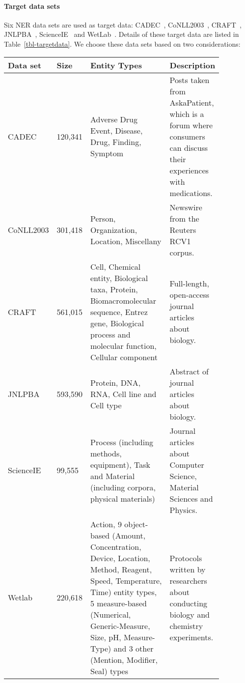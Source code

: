 \documentclass[11pt,a4paper]{article}
\begin{document}
\paragraph{Target data sets}
Six NER data sets are used as target data: CADEC~\cite{Karimi:Metke:JBI:2015}, CoNLL2003~\cite{Sang:Meulder:CONLL:2003}, CRAFT~\cite{Bada:Eckert:BMC:2012}, JNLPBA~\cite{Collier:Kim:BioNLP:2004}, ScienceIE~\cite{Augenstein:Das:SemEval:2017} and WetLab~\cite{Kulkarni:Xu:NAACL:2018}. 
Details of these target data are listed in Table~\ref{tbl-targetdata}. 
We choose these data sets based on two considerations: 

\begin{table*}[tb]
\begin{small}
\begin{center}
\begin{tabular}{p{0.1\linewidth}p{0.09\linewidth}p{0.43\linewidth}p{0.25\linewidth}}
\toprule
\bf Data set & \bf Size & \bf Entity Types & \bf Description \\ \midrule
CADEC & 120,341 & Adverse Drug Event, Disease, Drug, Finding, Symptom & Posts taken from AskaPatient, which is a forum where consumers can discuss their experiences with medications. \\ \midrule
CoNLL2003 & 301,418 & Person, Organization, Location, Miscellany & Newswire from the Reuters RCV1 corpus. \\ \midrule
CRAFT & 561,015 & Cell, Chemical entity, Biological taxa, Protein, Biomacromolecular sequence, Entrez gene, Biological process and molecular function, Cellular component & Full-length, open-access journal articles about biology. \\ \midrule
JNLPBA & 593,590 & Protein, DNA, RNA, Cell line and Cell
type & Abstract of journal articles about biology. \\ \midrule
ScienceIE & 99,555 & Process (including methods, equipment), Task and Material (including corpora, physical materials) & Journal articles about Computer Science, Material Sciences and Physics. \\ \midrule
Wetlab & 220,618 & Action, 9 object-based (Amount, Concentration, Device, Location, Method, Reagent, Speed, Temperature, Time) entity types, 5 measure-based (Numerical, Generic-Measure, Size, pH, Measure-Type) and 3 other (Mention, Modifier, Seal) types & Protocols written by researchers about conducting biology and chemistry experiments. \\ 
\bottomrule
\end{tabular}
\caption{\label{tbl-targetdata}List of the target NER data sets and their specifications. Size is shown in number of tokens.}
\end{center}
\end{small}
\end{table*}
\end{document}
